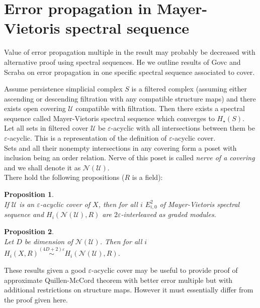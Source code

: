 \documentclass[a4paper, 12pt]{article}
\newtheorem{proposition}{Proposition}
\theoremstyle{definition}
\theoremstyle{remark}
\newcommand{\define}[1]{{\textit{#1}}}
\begin{document}
\section{Error propagation in Mayer-Vietoris spectral sequence}

Value of error propagation multiple in the result may probably be decreased with alternative proof using spectral sequences. He we outline results of Govc and Scraba on error propagation in one specific spectral sequence associated to cover.

Assume persistence simplicial complex $S$ is a filtered complex (assuming either ascending or descending filtration with any compatible structure maps) and there exists open covering $\mathcal{U}$ compatible with filtration. Then there exists a spectral sequence called Mayer-Vietoris spectral sequence which converges to $H_{\star}(S)$. {\cite[Theorem 2.30]{GS16}}\\

Let all sets in filtered cover $\mathcal{U}$ be $\varepsilon$-acyclic with all intersections between them be $\varepsilon$-acyclic. This is a representation of the definition of $\varepsilon$-acyclic cover. {\cite[Definition 3.2]{GS16}}\\

Sets and all their nonempty intersections in any covering form a poset with inclusion being an order relation. Nerve of this poset is called \define{nerve of a covering} and we shall denote it as $\mathcal{N}(\mathcal{U})$.\\

There hold the following propositions ($R$ is a field):

\begin{proposition} {\cite[Corollary 5.2]{GS16}}\\
  If $\mathcal{U}$ is an $\varepsilon$-acyclic cover of $X$, then for all $i$ $E^2_{i,0}$ of Mayer-Vietoris spectral sequence and $H_{i}(\mathcal{N}(\mathcal{U}),R)$ are $2\varepsilon$-interleaved as graded modules.
\end{proposition}

\begin{proposition} {\cite[Theorem 7.1]{GS16}}\\
  Let $D$ be dimension of $\mathcal{N}(\mathcal{U})$. Then for all $i$ $H_i(X,R) \stackrel{(4D+2)\varepsilon}{\sim} H_i(\mathcal{N}(\mathcal{U}),R)$.
\end{proposition}

These results given a good $\varepsilon$-acyclic cover may be useful to provide proof of approximate Quillen-McCord theorem with better error multiple but with additional restrictions on structure maps. However it must essentially differ from the proof given here.
\end{document}
